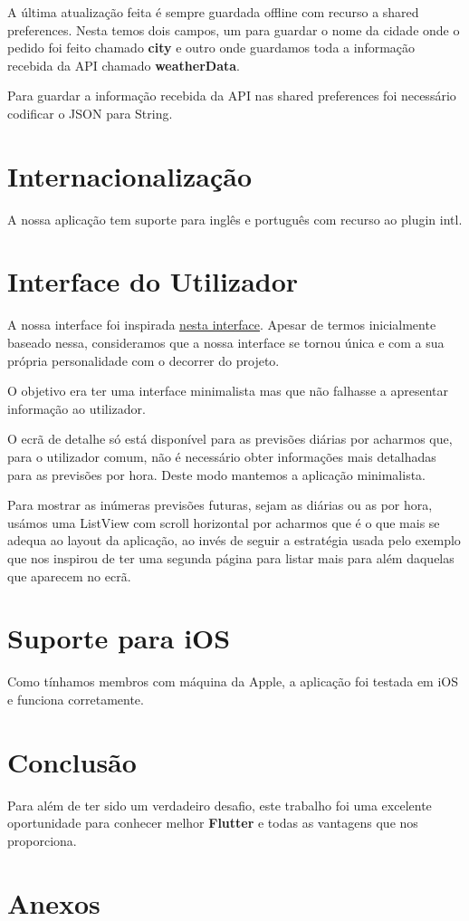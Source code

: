 \documentclass[11pt]{article}
\begin{document}
	A última atualização feita é sempre guardada offline com recurso a shared preferences. Nesta temos dois campos, um para guardar o nome da cidade onde o pedido foi feito chamado \textbf{city} e outro onde guardamos toda a informação recebida da API chamado \textbf{weatherData}.
	
	Para guardar a informação recebida da API nas shared preferences foi necessário codificar o JSON para String.
	
	
	\large
	\section{Internacionalização}
	\normalsize
	
	A nossa aplicação tem suporte para inglês e português com recurso ao plugin intl.
	
	
	\large
	\section{Interface do Utilizador}
	\normalsize
	
	A nossa interface foi inspirada \color{blue}\underline{\href{https://search.muz.li/OThiNGFlMTE2}{nesta interface}}\color{black}. Apesar de termos inicialmente baseado nessa, consideramos que a nossa interface se tornou única e com a sua própria personalidade com o decorrer do projeto.
	
	O objetivo era ter uma interface minimalista mas que não falhasse a apresentar informação ao utilizador.
	
	O ecrã de detalhe só está disponível para as previsões diárias por acharmos que, para o utilizador comum, não é necessário obter informações mais detalhadas para as previsões por hora. Deste modo mantemos a aplicação minimalista.
	
	Para mostrar as inúmeras previsões futuras, sejam as diárias ou as por hora, usámos uma ListView com scroll horizontal por acharmos que é o que mais se adequa ao layout da aplicação, ao invés de seguir a estratégia usada pelo exemplo que nos inspirou de ter uma segunda página para listar mais para além daquelas que aparecem no ecrã.


	\large
	\section{Suporte para iOS}
	\normalsize
	
	Como tínhamos membros com máquina da Apple, a aplicação foi testada em iOS e funciona corretamente.
	

	\large
	\section{Conclusão}
	\normalsize
	
	Para além de ter sido um verdadeiro desafio, este trabalho foi uma excelente oportunidade para conhecer melhor \textbf{Flutter} e todas as vantagens que nos proporciona.
	

	\large
	\section{Anexos}
	\normalsize
	
	\listoffigures
	\lstlistoflistings
\end{document}
